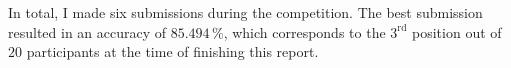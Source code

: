 In total, I made six submissions during the competition. The best
submission resulted in an accuracy of $85.494\,\%$, which corresponds to
the $3^{\text{rd}}$ position out of $20$ participants at the time of finishing this report.